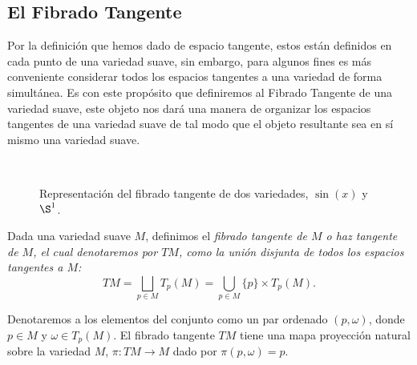 \subsection{El Fibrado Tangente}\label{Subsección: Fibrado Tangente}
Por la definición que hemos dado de espacio tangente, estos están definidos en cada punto de una variedad suave, sin embargo, para algunos fines es más conveniente considerar todos los espacios tangentes a una variedad de forma simultánea. Es con este propósito que definiremos al Fibrado Tangente de una variedad suave, este objeto nos dará una manera de organizar los espacios tangentes de una variedad suave de tal modo que el objeto resultante sea en sí mismo una variedad suave.

\begin{center}
	\begin{figure}[h!]
		\centering
		\begin{subfigure}{0.35\textwidth}
			\centering
			
		\end{subfigure}
		\hspace{40pt}
		\begin{subfigure}{0.35\textwidth}
			\centering
			
		\end{subfigure}
		\\[20pt]
		\begin{subfigure}{0.35\textwidth}
			\centering
			
		\end{subfigure}
		\hspace{30pt}
		\begin{subfigure}{0.35\textwidth}
			\centering
			
		\end{subfigure}
    \caption{Representación del fibrado tangente de dos variedades, $\sin(x)$ y $\S^{1}$.}
  \end{figure}
\end{center}

\begin{definition}
	Dada una variedad suave $M$, definimos el \it{fibrado tangente de $M$} o \it{haz tangente de $M$}, el cual denotaremos por $TM$, como la unión disjunta de todos los espacios tangentes a $M$:
	\[ TM = \bigsqcup_{p \in M} T_p(M) = \bigcup_{p \in M} \{p\} \times T_p(M). \]
\end{definition}

Denotaremos a los elementos del conjunto como un par ordenado $(p, \omega)$, donde $p \in M$ y $\omega \in T_p(M)$. El fibrado tangente $TM$ tiene una mapa proyección natural sobre la variedad $M$, $\pi: TM \to M$ dado por $\pi(p,\omega)=p$.

